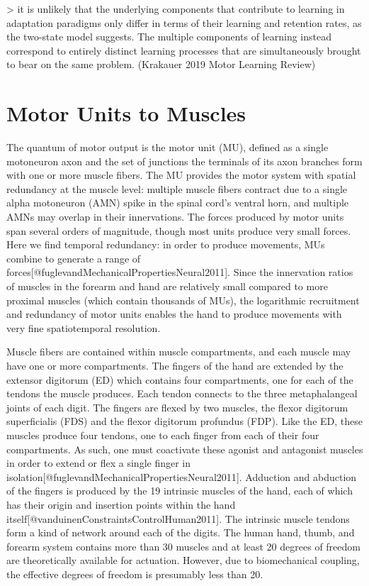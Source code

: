 \documentclass[../main.tex]{subfiles}
\begin{document}
{{{> it is unlikely that the underlying components that contribute to learning in adaptation paradigms only differ in terms of their learning and retention rates, as the two-state model suggests. The multiple components of learning instead correspond to entirely distinct learning processes that are simultaneously brought to bear on the same problem. (Krakauer 2019 Motor Learning Review)




\section{Motor Units to Muscles}\label{motor-units-to-muscles}

The quantum of motor output is the motor unit (MU), defined as a single
motoneuron axon and the set of junctions the terminals of its axon
branches form with one or more muscle fibers. The MU provides the motor
system with spatial redundancy at the muscle level: multiple muscle
fibers contract due to a single alpha motoneuron (AMN) spike in the
spinal cord's ventral horn, and multiple AMNs may overlap in their
innervations. The forces produced by motor units span several orders of
magnitude, though most units produce very small forces. Here we find
temporal redundancy: in order to produce movements, MUs combine to
generate a range of
forces{[}@fuglevandMechanicalPropertiesNeural2011{]}. Since the
innervation ratios of muscles in the forearm and hand are relatively
small compared to more proximal muscles (which contain thousands of
MUs), the logarithmic recruitment and redundancy of motor units enables
the hand to produce movements with very fine spatiotemporal resolution.

Muscle fibers are contained within muscle compartments, and each muscle
may have one or more compartments. The fingers of the hand are extended
by the extensor digitorum (ED) which contains four compartments, one for
each of the tendons the muscle produces. Each tendon connects to the
three metaphalangeal joints of each digit. The fingers are flexed by two
muscles, the flexor digitorum superficialis (FDS) and the flexor
digitorum profundus (FDP). Like the ED, these muscles produce four
tendons, one to each finger from each of their four compartments. As
such, one must coactivate these agonist and antagonist muscles in order
to extend or flex a single finger in
isolation{[}@fuglevandMechanicalPropertiesNeural2011{]}. Adduction and
abduction of the fingers is produced by the 19 intrinsic muscles of the
hand, each of which has their origin and insertion points within the
hand itself{[}@vanduinenConstraintsControlHuman2011{]}. The intrinsic
muscle tendons form a kind of network around each of the digits. The
human hand, thumb, and forearm system contains more than 30 muscles and
at least 20 degrees of freedom are theoretically available for
actuation. However, due to biomechanical coupling, the effective degrees
of freedom is presumably less than 20.

}}}
\end{document}
